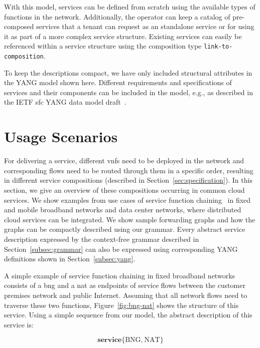 \documentclass{sig-alternate-per}
\begin{document}
With this model, services can be defined from scratch using the available types of functions in the 
network. Additionally, the operator can keep a catalog of pre-composed services that a 
tenant can request as an standalone service or for using it as part of a more 
complex service structure. Existing services can easily be referenced within a 
service structure using the composition type \texttt{link-to-composition}. 

To keep the descriptions compact, we have only included structural attributes in the
YANG model shown here. Different requirements and specifications of services and 
their components can be included in the model, e.g., as described in the
IETF \ac{sfc} YANG data model draft~\cite{draft-penno-sfc-yang-11}.


\section{Usage Scenarios}
\label{sec:usecases}

For delivering a service, different \acp{vnf} need to be deployed 
in the network and corresponding flows need to be routed through them in a specific 
order, resulting in different service compositions (described in Section~\ref{sec:specification}).
In this section, we give an overview of these compositions occurring in common 
cloud services. We show examples from use cases of service function
chaining~\cite{broadbandforum, draft-ietf-sfc-use-case-mobility-03,
draft-ietf-sfc-dc-use-cases-02, draft-liu-sfc-use-cases-08} in fixed and mobile
broadband networks and data center networks, where distributed cloud services 
can be integrated. We show sample forwarding graphs and how the graphs can be compactly
described using our grammar. Every abstract service description expressed by the 
context-free grammar described in Section~\ref{subsec:grammar} can also be expressed 
using corresponding YANG definitions shown in Section~\ref{subsec:yang}. 

A simple example
of service function chaining in fixed broadband networks consists of a \ac{bng} and a 
\ac{nat} as endpoints of service flows between the customer premises network and public
Internet. Assuming that all network flows need to traverse these two functions, 
Figure~\ref{fig:bng-nat} shows the structure of this service. Using a simple 
sequence from our model, the abstract description of this service is:

{\scriptsize
\vspace{-8pt}
\begin{equation*}
\textbf{service} \textbf{\{} \text{BNG} \textbf{,} ~\text{NAT} \textbf{\}} 
\end{equation*}
}
\end{document}

